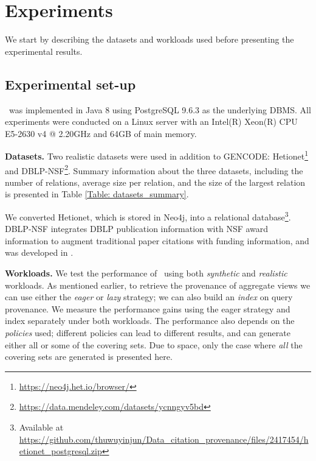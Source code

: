 \section{Experiments}
\label{sec:experiments}
We start by describing the datasets and workloads used before presenting the experimental results. 

\subsection{Experimental set-up}
\provalg\ was implemented in Java 8 using PostgreSQL 9.6.3 as the underlying DBMS. All experiments were conducted
on a Linux server with an Intel(R) Xeon(R) CPU E5-2630 v4 @ 2.20GHz and 64GB of main memory. 


{\bf Datasets.} %
Two realistic datasets were used in addition to GENCODE: 
Hetionet\footnote{\url{https://neo4j.het.io/browser/}} and DBLP-NSF\footnote{\url{https://data.mendeley.com/datasets/ycnngyv5bd}}. 
Summary information about the three datasets, including the number of relations, average size per relation, and the size of the largest relation is presented in Table \ref{Table: datasets_summary}.

We converted Hetionet, which is stored in Neo4j, into a relational database\footnote{Available at 
\url{https://github.com/thuwuyinjun/Data_citation_provenance/files/2417454/hetionet_postgresql.zip}}.
DBLP-NSF integrates DBLP publication information with NSF award information to augment traditional paper citations with funding information, and was developed in \cite{wu2018data}.

{\bf Workloads.} 
We test the performance of \provalg\ using both {\em synthetic} and {\em realistic} workloads. 
As mentioned earlier, to retrieve the provenance of aggregate views we can use either the {\em eager} or {\em lazy} strategy; we can also build an {\em index} on query provenance. We measure the performance gains using the {eager strategy} and index separately under both workloads. The performance also depends on the {\em policies}
used; different policies can lead to different results, and can generate either all or some of the covering sets. Due to space, only the case where {\em all} the covering sets are generated is presented here.

